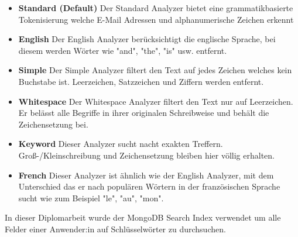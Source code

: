 \begin{itemize}
    \item \textbf{Standard (Default)}
        \newline
        Der Standard Analyzer bietet eine grammatikbasierte Tokenisierung welche E-Mail Adressen und alphanumerische Zeichen erkennt
    \item \textbf{English}
        \newline
        Der English Analyzer berücksichtigt die englische Sprache, bei diesem werden Wörter wie "and", "the", "is" usw. entfernt.
    \item \textbf{Simple}
        \newline
        Der Simple Analyzer filtert den Text auf jedes Zeichen welches kein Buchstabe ist. Leerzeichen, Satzzeichen und Ziffern werden entfernt.
    \item \textbf{Whitespace}
        \newline
        Der Whitespace Analyzer filtert den Text nur auf Leerzeichen. Er belässt alle Begriffe in ihrer originalen Schreibweise und behält die Zeichensetzung bei.
    \item \textbf{Keyword}
        \newline
        Dieser Analyzer sucht nacht exakten Treffern. Groß-/Kleinschreibung und Zeichensetzung bleiben hier völlig erhalten.
    \item \textbf{French}
        \newline
        Dieser Analyzer ist ähnlich wie der English Analyzer, mit dem Unterschied das er nach populären Wörtern in der französischen Sprache sucht wie zum Beispiel "le", "au", "mon".
\end{itemize}

In dieser Diplomarbeit wurde der MongoDB Search Index verwendet um alle Felder einer Anwender:in auf Schlüsselwörter zu durchsuchen.
\cite{Search_Indexes}
\cite{Atlas_Indexes}





